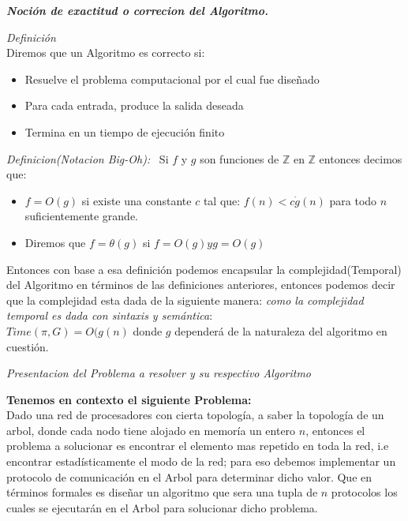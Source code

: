 \documentclass[11pt]{article}
\begin{document}
\textbf{\emph{Noción de exactitud o correcion del Algoritmo.}}

\emph{Definición}\\

Diremos que un Algoritmo es correcto si:
\begin{itemize}
       \item Resuelve el problema computacional por el cual fue diseñado
       \item Para cada entrada, produce la salida deseada
       \item Termina en un tiempo de ejecución finito

\end{itemize}
\emph{Definicion(Notacion Big-Oh):} \
Si $f$ y $g$ son funciones de $\mathbb{Z}$ en $\mathbb{Z}$ entonces decimos que:\
\begin{itemize}
    \item $f = O(g)$ si existe una constante $c$ tal que:
    $f(n) < c\dot g(n)$ para todo $n$ suficientemente grande.
    \item Diremos que $f = \theta(g)$ si $f = O(g) y g = O(g)$
\end{itemize}

Entonces con base a esa definición podemos encapsular la complejidad(Temporal)
del Algoritmo en términos de las definiciones anteriores,
entonces podemos decir que la complejidad esta dada de la siguiente manera:
 \emph{ como la complejidad temporal es dada con sintaxis y semántica}:\\

$ Time( \pi, G) = O(g(n) $ donde $ g $ dependerá de la naturaleza del algoritmo en cuestión.\\
\newpage
\begin{center}
    \begin{Large}
    \textit{Presentacion del Problema a resolver y su respectivo Algoritmo}
    \end{Large}
\end{center}
\textbf{ Tenemos en contexto el siguiente Problema:}
\\
Dado una red de procesadores con cierta topología, a saber la topología de un arbol,
donde cada nodo tiene alojado en memoría un entero $n$, entonces el problema a solucionar es encontrar el
elemento mas repetido en toda la red, i.e encontrar estadísticamente el modo de la red;
para eso debemos implementar un protocolo de comunicación en el Arbol para determinar dicho valor.
Que en términos formales es diseñar un algoritmo que sera una tupla de $n$ protocolos los cuales
se ejecutarán en el Arbol para solucionar dicho problema.
\end{document}
